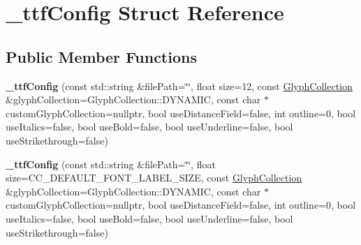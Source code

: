 \hypertarget{struct__ttfConfig}{}\section{\+\_\+ttf\+Config Struct Reference}
\label{struct__ttfConfig}
\subsection*{Public Member Functions}
\begin{DoxyCompactItemize}
\item 
\mbox{\label{struct__ttfConfig_ac9e64a73547785943b423c44a47e3c88}} 
{\bfseries \+\_\+ttf\+Config} (const std\+::string \&file\+Path=\char`\"{}\char`\"{}, float size=12, const \hyperlink{group__base_gac5e83e2fc436edc7833f2bcabad984f3}{Glyph\+Collection} \&glyph\+Collection=Glyph\+Collection\+::\+D\+Y\+N\+A\+M\+IC, const char $\ast$custom\+Glyph\+Collection=nullptr, bool use\+Distance\+Field=false, int outline=0, bool use\+Italics=false, bool use\+Bold=false, bool use\+Underline=false, bool use\+Strikethrough=false)
\item 
\mbox{\label{struct__ttfConfig_a450ef0074a811881740b293a00187848}} 
{\bfseries \+\_\+ttf\+Config} (const std\+::string \&file\+Path=\char`\"{}\char`\"{}, float size=C\+C\+\_\+\+D\+E\+F\+A\+U\+L\+T\+\_\+\+F\+O\+N\+T\+\_\+\+L\+A\+B\+E\+L\+\_\+\+S\+I\+ZE, const \hyperlink{group__base_gac5e83e2fc436edc7833f2bcabad984f3}{Glyph\+Collection} \&glyph\+Collection=Glyph\+Collection\+::\+D\+Y\+N\+A\+M\+IC, const char $\ast$custom\+Glyph\+Collection=nullptr, bool use\+Distance\+Field=false, int outline=0, bool use\+Italics=false, bool use\+Bold=false, bool use\+Underline=false, bool use\+Strikethrough=false)
\end{DoxyCompactItemize}
